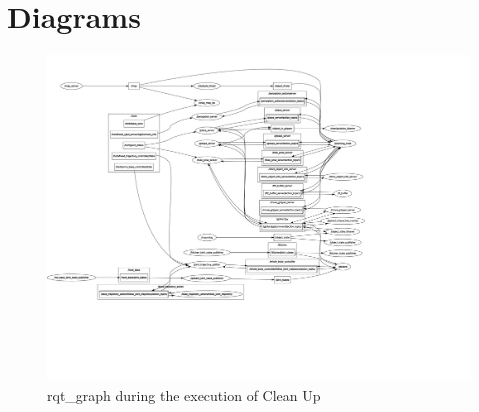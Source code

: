 \documentclass[main.tex]{subfiles}
\begin{document}
		\section{Diagrams}
		\begin{figure}[H]
			\centering
			\includegraphics[width=1.5\textwidth]{pictures/diagramms/rqt_interfaces_cleanup_vertical}
			\caption{rqt\_graph during the execution of Clean Up}
			\label{cleanup-interfaces}
		\end{figure}
		\endgroup
\end{document}
